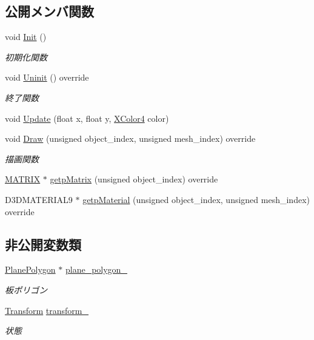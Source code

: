 \subsection*{公開メンバ関数}
\begin{DoxyCompactItemize}
\item 
void \mbox{\hyperlink{class_render_texture_a498eb8be8672e01164b3770cdff43291}{Init}} ()
\begin{DoxyCompactList}\small\item\em 初期化関数 \end{DoxyCompactList}\item 
void \mbox{\hyperlink{class_render_texture_a0e55cd9b412d87dfe1f4b90f29f357c8}{Uninit}} () override
\begin{DoxyCompactList}\small\item\em 終了関数 \end{DoxyCompactList}\item 
void \mbox{\hyperlink{class_render_texture_ac27f8cfac7903dd502de61e22abfc457}{Update}} (float x, float y, \mbox{\hyperlink{_vector3_d_8h_a680c30c4a07d86fe763c7e01169cd6cc}{X\+Color4}} color)
\item 
void \mbox{\hyperlink{class_render_texture_a529ab829c676470ae5764b42cba9efb0}{Draw}} (unsigned object\+\_\+index, unsigned mesh\+\_\+index) override
\begin{DoxyCompactList}\small\item\em 描画関数 \end{DoxyCompactList}\item 
\mbox{\hyperlink{_vector3_d_8h_a032295cd9fb1b711757c90667278e744}{M\+A\+T\+R\+IX}} $\ast$ \mbox{\hyperlink{class_render_texture_adafb7e9aeea3c298cbfcc71e35ed9457}{getp\+Matrix}} (unsigned object\+\_\+index) override
\item 
D3\+D\+M\+A\+T\+E\+R\+I\+A\+L9 $\ast$ \mbox{\hyperlink{class_render_texture_a1defe8bfacccf91dc7479a977e70578c}{getp\+Material}} (unsigned object\+\_\+index, unsigned mesh\+\_\+index) override
\end{DoxyCompactItemize}
\subsection*{非公開変数類}
\begin{DoxyCompactItemize}
\item 
\mbox{\hyperlink{class_plane_polygon}{Plane\+Polygon}} $\ast$ \mbox{\hyperlink{class_render_texture_ad354ed8b9968b5741feb43775cc821b9}{plane\+\_\+polygon\+\_\+}}
\begin{DoxyCompactList}\small\item\em 板ポリゴン \end{DoxyCompactList}\item 
\mbox{\hyperlink{class_transform}{Transform}} \mbox{\hyperlink{class_render_texture_a390e49a5efe8a6a977e8ba287ec969a2}{transform\+\_\+}}
\begin{DoxyCompactList}\small\item\em 状態 \end{DoxyCompactList}\end{DoxyCompactItemize}


